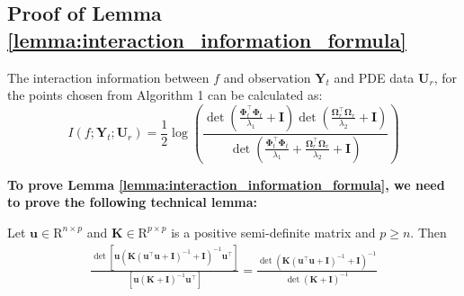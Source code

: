 \subsection{Proof of Lemma \ref{lemma:interaction_information_formula}}
\begin{lemma}
    \label{lemma:interaction_information_formula}
    The interaction information between $f$ and observation $\mathbf{Y}_t$ and PDE data $\mathbf{U}_r$, for the points chosen from Algorithm 1 can be calculated as:
    \begin{equation*}
        I (f; \mathbf{Y}_t; \mathbf{U}_r) = \frac{1}{2}  \log (\frac{\det(\frac{\boldsymbol{\Phi}_t^\top \boldsymbol{\Phi}_t}{\lambda_1} + \mathbf{I})\det(\frac{\boldsymbol{\Omega}_r^\top \boldsymbol{\Omega}_r}{\lambda_2} + \mathbf{I})}{\det(\frac{\boldsymbol{\Phi}_t^\top \boldsymbol{\Phi}_t}{\lambda_1} + \frac{\boldsymbol{\Omega}_r^\top \boldsymbol{\Omega}_r}{\lambda_2} + \mathbf{I})})
    \end{equation*}
\end{lemma}
\textbf{To prove Lemma \ref{lemma:interaction_information_formula}, we need to prove the following technical lemma:}
\begin{sublemma}    \label{lemma:det_division}
    Let $\mathbf{u} \in \mathrm{R}^{n \times p}$ and $\mathbf{K} \in \mathrm{R}^{p \times p}$ is a positive semi-definite matrix and $p \ge n$. Then 
    \begin{align*}
    \frac{\det [\mathbf{u}\left(\mathbf{K}(\mathbf{u}^\top\mathbf{u}+\mathbf{I})^{-1} + \mathbf{I}\right)^{-1}\mathbf{u}^\top]}{[\mathbf{u}\left(\mathbf{K} + \mathbf{I}\right)^{-1}\mathbf{u}^\top]} =  \frac{\det \left(\mathbf{K}(\mathbf{u}^\top\mathbf{u}+\mathbf{I})^{-1} + \mathbf{I}\right)^{-1}}{\det \left(\mathbf{K} + \mathbf{I}\right)^{-1}}   
    \end{align*}
\end{sublemma}
